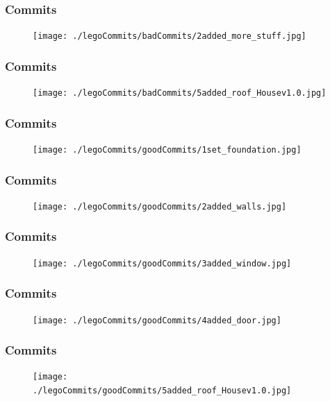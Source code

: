 \documentclass{beamer}
\begin{document}
\begin{frame}[fragile]
	\frametitle{Commits}
	\begin{figure}
		\centering
		\texttt{[image: ./legoCommits/badCommits/2added\_more\_stuff.jpg]}
	\end{figure}
\end{frame}

\begin{frame}[fragile]
	\frametitle{Commits}
	\begin{figure}
		\centering
		\texttt{[image: ./legoCommits/badCommits/5added\_roof\_Housev1.0.jpg]}
	\end{figure}
\end{frame}

\begin{frame}[fragile]
	\frametitle{Commits}
	\begin{figure}
		\centering
		\texttt{[image: ./legoCommits/goodCommits/1set\_foundation.jpg]}
	\end{figure}
\end{frame}

\begin{frame}[fragile]
	\frametitle{Commits}
	\begin{figure}
		\centering
		\texttt{[image: ./legoCommits/goodCommits/2added\_walls.jpg]}
	\end{figure}
\end{frame}

\begin{frame}[fragile]
	\frametitle{Commits}
	\begin{figure}
		\centering
		\texttt{[image: ./legoCommits/goodCommits/3added\_window.jpg]}
	\end{figure}
\end{frame}

\begin{frame}[fragile]
	\frametitle{Commits}
	\begin{figure}
		\centering
		\texttt{[image: ./legoCommits/goodCommits/4added\_door.jpg]}
	\end{figure}
\end{frame}

\begin{frame}[fragile]
	\frametitle{Commits}
	\begin{figure}
		\centering
		\texttt{[image: ./legoCommits/goodCommits/5added\_roof\_Housev1.0.jpg]}
	\end{figure}
\end{frame}
\end{document}
